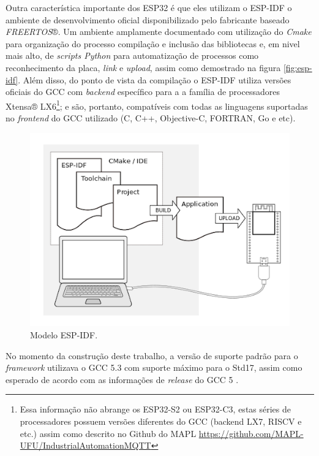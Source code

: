 Outra característica importante dos ESP32 é que eles utilizam o \ac{ESP-IDF} o ambiente de desenvolvimento oficial 
disponibilizado pelo fabricante baseado \textit{FREERTOS}®. Um ambiente amplamente documentado com utilização do 
\textit{Cmake} para organização do processo compilação e inclusão das bibliotecas e, em nivel mais alto, de \textit{scripts Python}
para automatização de processos como reconhecimento da placa, \textit{link} e \textit{upload}, assim como demostrado na figura
\autoref{fig:esp-idf}. Além disso, do ponto de 
vista da compilação o \ac{ESP-IDF} utiliza versões oficiais do \ac{GCC} com \textit{backend} específico para a a família de 
processadores Xtensa® LX6\footnote{Essa informação não abrange os ESP32-S2 ou ESP32-C3, estas séries de processadores
possuem versões diferentes do \ac{GCC} (backend LX7, RISCV e etc.) assim como descrito no Github do \ac{MAPL} \url{https://github.com/MAPL-UFU/IndustrialAutomationMQTT}};
e são, portanto, compatíveis com todas as linguagens suportadas no \textit{frontend} do \ac{GCC} utilizado (C, C++, Objective-C,
FORTRAN, Go e etc).

\begin{figure}[htb]
    \begin{center}
	    \includegraphics[scale=0.5]{figs/comp-flow.png}
	\end{center}
	\caption{\label{fig:esp-idf} Modelo \ac{ESP-IDF}.} 
\end{figure}

No momento da construção deste trabalho, a versão de suporte padrão para o \textit{framework} utilizava o GCC 5.3  com 
suporte máximo para o Std17\cite{suported-c}, assim como esperado de acordo com as informações de \textit{release} do GCC
5 \cite{gcc-5}. 

